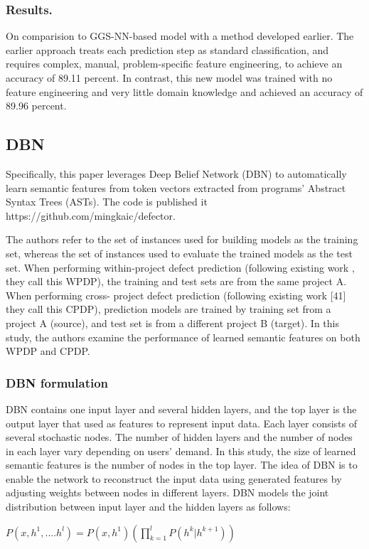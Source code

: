 \documentclass{article}
\begin{document}
\subsubsection{Results.}
On comparision to GGS-NN-based model with a method developed earlier. The earlier approach treats each prediction step as standard classification, and requires complex, manual, problem-specific feature engineering, to achieve an accuracy of 89.11 percent. In contrast, this new model was trained with no feature engineering and very little domain knowledge and achieved an accuracy of 89.96 percent.
\subsection{DBN}
Specifically, this paper leverages Deep Belief Network (DBN) to automatically learn semantic features from token vectors extracted from programs’ Abstract Syntax Trees (ASTs). The code is published it https://github.com/mingkaic/defector.

The authors refer to the set of instances used for building models as the training set, whereas the set of instances used to evaluate the trained models as the test set. When performing within-project defect prediction (following existing work , they call this WPDP), the training and test sets are from the same project A. When performing cross- project defect prediction (following existing work [41] they call this CPDP), prediction models are trained by training set from a project A (source), and test set is from a different project B (target).
In this study, the authors examine the performance of learned semantic features on both WPDP and CPDP.
\subsubsection{DBN formulation}
DBN contains one input layer and several hidden layers, and the top layer is the output layer that used as features to represent input data. Each layer consists of several stochastic nodes. The number of hidden layers and the number of nodes in each layer vary depending on users’ demand. In this study, the size of learned semantic features is the number of nodes in the top layer. The idea of DBN is to enable the network to reconstruct the input data using generated features by adjusting weights between nodes in different layers.
DBN models the joint distribution between input layer and the hidden layers as follows:

\begin{math}
P(x,h^1,....h^l) = P(x,h^1)(\prod_{k=1}^l P(h^k|h^{k+1}))
\end{math}
\end{document}

